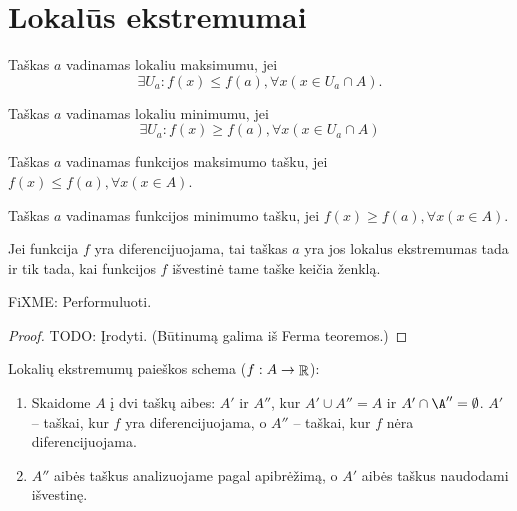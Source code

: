 \section{Lokalūs ekstremumai}

\begin{defn}
  Taškas $a$ vadinamas lokaliu maksimumu, jei
  \begin{equation*}
    \exists U_{a} : f(x) \leq f(a), \forall x (x \in U_{a} \cap A).
  \end{equation*}
\end{defn}

\begin{defn}
  Taškas $a$ vadinamas lokaliu minimumu, jei
  \begin{equation*}
    \exists U_{a} : f(x) \geq f(a), \forall x (x \in U_{a} \cap A)
  \end{equation*}
\end{defn}

\begin{defn}
  Taškas $a$ vadinamas funkcijos maksimumo tašku, jei 
  $f(x) \leq f(a), \forall x (x \in A)$.
\end{defn}

\begin{defn}
  Taškas $a$ vadinamas funkcijos minimumo tašku, jei
  $f(x) \geq f(a), \forall x (x \in A)$.
\end{defn}

\begin{prop}
  Jei funkcija $f$ yra diferencijuojama, tai taškas $a$ yra jos
  lokalus ekstremumas tada ir tik tada, kai funkcijos $f$ išvestinė
  tame taške keičia ženklą.

  FiXME: Performuluoti.
  \begin{proof}
    TODO: Įrodyti. (Būtinumą galima iš Ferma teoremos.)
  \end{proof}
\end{prop}

Lokalių ekstremumų paieškos schema ($f : A \to \mathop{\mathbb{R}}$):
\begin{enumerate}
  \item Skaidome $A$ į dvi taškų aibes: $A'$ ir $A''$, kur
    $A' \cup A'' = A$ ir $A' \cap \A'' = \emptyset$.
    $A'$ – taškai, kur $f$ yra diferencijuojama, o 
    $A''$ – taškai, kur $f$ nėra diferencijuojama.
  \item $A''$ aibės taškus analizuojame pagal apibrėžimą, o 
    $A'$ aibės taškus naudodami išvestinę.
\end{enumerate}
